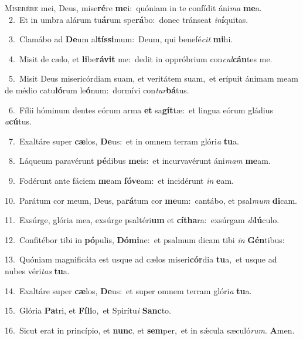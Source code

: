 \lettrine{\initial\textcolor{\initialcolor}{M}}{iserére} mei, Deus, mise\-\textbf{ré}\-re \textbf{me}\-i:~\star quóniam in te confídit áni\textit{ma} \textbf{me}\-a.\\
{\numbfont\textcolor{\numbcolor}{~2.}}~Et in umbra alárum tu\-\textbf{á}\-rum spe\-\textbf{rá}\-bo:~\star donec tránseat \textit{in}\-\textbf{í}quitas.\par
{\numbfont\textcolor{\numbcolor}{~3.}}~Clamábo ad \textbf{De}\-um al\-\textbf{tís}\-\textbf{si}mum:~\star Deum, qui benefé\textit{cit} \textbf{mi}\-hi.\par
{\numbfont\textcolor{\numbcolor}{~4.}}~Misit de cælo, et \textbf{li}\-be\-\textbf{rá}\-\textbf{vit} me:~\star dedit in oppróbrium con\-\textit{cul}\-\textbf{cán}tes me.\par
{\numbfont\textcolor{\numbcolor}{~5.}}~Misit Deus misericórdiam suam, et veritátem suam,~\dagger et erípuit ánimam meam de médio catu\-\textbf{ló}\-rum le\-\textbf{ó}\-num:~\star dormívi con\-\textit{tur}\-\textbf{bá}tus.\par
{\numbfont\textcolor{\numbcolor}{~6.}}~Fílii hóminum dentes eórum arma \textbf{et} sa\-\textbf{gít}\-tæ:~\star et lingua eórum gládius \textit{a}\-\textbf{cú}tus.\par
{\numbfont\textcolor{\numbcolor}{~7.}}~Exaltáre super \textbf{cæ}\-los, \textbf{De}\-us:~\star et in omnem terram glóri\textit{a} \textbf{tu}\-a.\par
{\numbfont\textcolor{\numbcolor}{~8.}}~Láqueum paravérunt \textbf{pé}\-dibus \textbf{me}\-is:~\star et incurvavérunt áni\textit{mam} \textbf{me}\-am.\par
{\numbfont\textcolor{\numbcolor}{~9.}}~Fodérunt ante fáciem \textbf{me}\-am \textbf{fó}\-\textbf{ve}am:~\star et incidérunt \textit{in} \textbf{e}\-am.\par
{\numbfont\textcolor{\numbcolor}{10.}}~Parátum cor meum, Deus, pa\-\textbf{rá}\-tum cor \textbf{me}\-um:~\star cantábo, et psal\textit{mum} \textbf{di}\-cam.\par
{\numbfont\textcolor{\numbcolor}{11.}}~Exsúrge, glória mea, exsúrge psaltéri\textbf{um} et \textbf{cí}\-\textbf{tha}ra:~\star exsúrgam \textit{di}\-\textbf{lú}culo.\par
{\numbfont\textcolor{\numbcolor}{12.}}~Confitébor tibi in \textbf{pó}\-pulis, \textbf{Dó}\-\textbf{mi}ne:~\star et psalmum dicam tibi \textit{in} \textbf{Gén}\-tibus:\par
{\numbfont\textcolor{\numbcolor}{13.}}~Quóniam magnificáta est usque ad cælos miseri\-\textbf{cór}\-dia \textbf{tu}\-a,~\star et usque ad nubes véri\textit{tas} \textbf{tu}\-a.\par
{\numbfont\textcolor{\numbcolor}{14.}}~Exaltáre super \textbf{cæ}\-los, \textbf{De}\-us:~\star et super omnem terram glóri\textit{a} \textbf{tu}\-a.\par
{\numbfont\textcolor{\numbcolor}{15.}}~Glória \textbf{Pa}\-tri, et \textbf{Fí}\-\textbf{li}o,~\star et Spirítu\textit{i} \textbf{Sanc}\-to.\par
{\numbfont\textcolor{\numbcolor}{16.}}~Sicut erat in princípio, et \textbf{nunc}\-, et \textbf{sem}\-per,~\star et in sǽcula sæculó\-\textit{rum}\-. \textbf{A}\-men.\par
